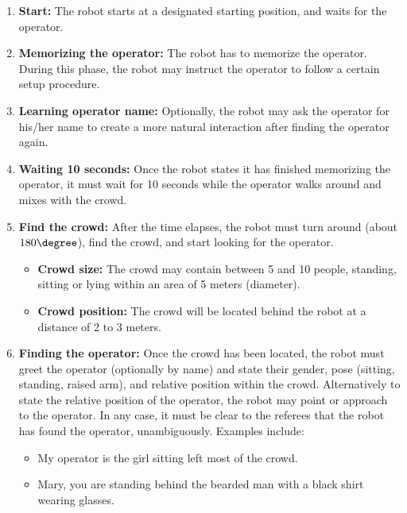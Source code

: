 \begin{enumerate}

  \item \textbf{Start:} The robot starts at a designated starting position, and waits for the  operator.

  \item \textbf{Memorizing the operator:} The robot has to memorize the operator. During this phase, the robot may instruct the operator to follow a certain setup procedure.

  \item \textbf{Learning operator name:} Optionally, the robot may ask the operator for his/her name to create a more natural interaction after finding the operator again.

  \item \textbf{Waiting 10 seconds:} Once the robot states it has finished memorizing the operator, it must wait for 10 seconds while the operator walks around and mixes with the crowd.

  \item \textbf{Find the crowd:} After the time elapses, the robot must turn around (about $180\degree$), find the crowd, and start looking for the operator.
  \begin{itemize}

    \item \textbf{Crowd size:} The crowd may contain between 5 and 10 people, standing, sitting or lying within an area of 5 meters (diameter).

    \item \textbf{Crowd position:} The crowd will be located behind the robot at a distance of 2 to 3 meters.
  \end{itemize}

  \item \textbf{Finding the operator:} Once the crowd has been located, the robot must greet the operator (optionally by name) and state their gender, pose (sitting, standing, raised arm), and relative position within the crowd. Alternatively to state the relative position of the operator, the robot may point or approach to the operator. In any case, it must be clear to the referees that the robot has found the operator, unambiguously. Examples include:
  \begin{itemize}

    \item My operator is the girl sitting left most of the crowd.

    \item Mary, you are standing behind the bearded man with a black shirt wearing glasses.


\end{itemize}
\end{enumerate}
